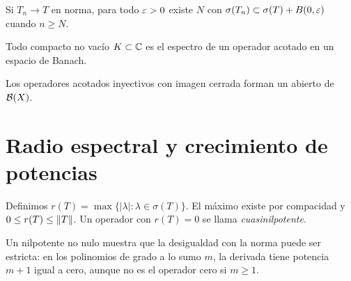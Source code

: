 \begin{ejercicio}\label{ej:v3-l08-6}
Si $T_n\to T$ en norma, para todo $\varepsilon>0$ existe $N$ con $\sigma(T_n)\subset\sigma(T)+B(0,\varepsilon)$ cuando $n\ge N$.
\end{ejercicio}


\begin{ejercicio}\label{ej:v3-l08-7}
Todo compacto no vacío $K\subset\mathbb C$ es el espectro de un operador acotado en un espacio de Banach.
\end{ejercicio}


\begin{ejercicio}\label{ej:v3-l08-8}
Los operadores acotados inyectivos con imagen cerrada forman un abierto de $\mathcal B(X)$.
\end{ejercicio}


\section{Radio espectral y crecimiento de potencias}\label{lec:v3-09}
\begin{definicion}
Definimos $r(T)=\max\{|\lambda|:\lambda\in\sigma(T)\}$. El máximo existe por compacidad y $0\le r(T)\le\left\lVert T\right\rVert$. Un operador con $r(T)=0$ se llama \emph{cuasinilpotente}.
\end{definicion}
Un nilpotente no nulo muestra que la desigualdad con la norma puede ser estricta: en los polinomios de grado a lo sumo $m$, la derivada tiene potencia $m+1$ igual a cero, aunque no es el operador cero si $m\ge1$.

